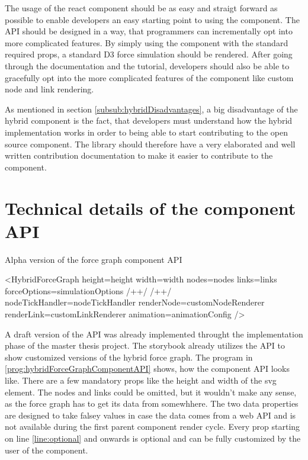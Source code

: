 The usage of the react component should be as easy and straigt forward as possible to enable developers an easy starting point to using the component. The API should be designed in a way, that programmers can incrementally opt into more complicated features. By simply using the component with the standard required props, a standard D3 force simulation should be rendered. After going through the documentation and the tutorial, developers should also be able to gracefully opt into the more complicated features of the component like custom node and link rendering.

As mentioned in section \ref{subsub:hybridDisadvantages}, a big disadvantage of the hybrid component is the fact, that developers must understand how the hybrid implementation works in order to being able to start contributing to the open source component. The library should therefore have a very elaborated and well written contribution documentation to make it easier to contribute to the component.

\section{Technical details of the component API}

\begin{program}
\caption{Alpha version of the force graph component API}
\label{prog:hybridForceGraphComponentAPI}
\begin{JsCode}
<HybridForceGraph 
  height={height}
  width={width}
  nodes={nodes}
  links={links}
  forceOptions={simulationOptions} /+\label{line:foceOptions}+/ /+\label{line:optional}+/ 
  nodeTickHandler={nodeTickHandler}
  renderNode={customNodeRenderer}
  renderLink={customLinkRenderer}
  animation={animationConfig}
/>
\end{JsCode}
\end{program}

A draft version of the API was already implemented throught the implementation phase of the master thesis project. The storybook already utilizes the API to show customized versions of the hybrid force graph. The program in \ref{prog:hybridForceGraphComponentAPI} shows, how the component API looks like. There are a few mandatory props like the height and width of the svg element. The nodes and links could be omitted, but it wouldn't make any sense, as the force graph has to get its data from somewhhere. The two data properties are designed to take falsey values in case the data comes from a web API and is not available during the first parent component render cycle. Every prop starting on line \ref{line:optional} and onwards is optional and can be fully customized by the user of the component.

